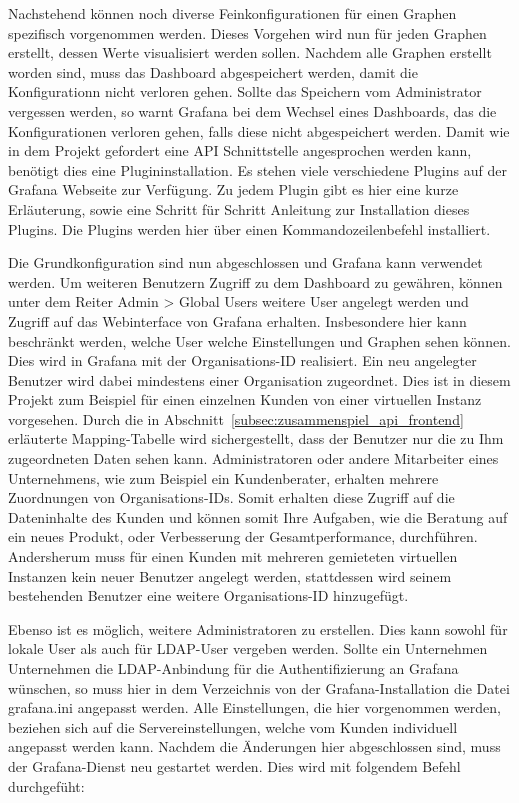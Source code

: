 {Nachstehend können noch diverse Feinkonfigurationen für einen Graphen
spezifisch vorgenommen werden. Dieses Vorgehen wird nun für jeden Graphen
erstellt, dessen Werte visualisiert werden sollen. Nachdem alle Graphen
erstellt worden sind, muss das Dashboard abgespeichert werden, damit die
Konfigurationn nicht verloren gehen. Sollte das Speichern vom
Administrator vergessen werden, so warnt Grafana bei dem Wechsel eines
Dashboards, das die Konfigurationen verloren gehen, falls diese nicht
abgespeichert werden. Damit wie in dem Projekt gefordert eine API
Schnittstelle angesprochen werden kann, benötigt dies eine Plugininstallation.
Es stehen viele verschiedene Plugins auf der Grafana Webseite zur Verfügung. Zu
jedem Plugin gibt es hier eine kurze Erläuterung, sowie eine Schritt für
Schritt Anleitung zur Installation dieses Plugins. Die Plugins werden hier über
einen Kommandozeilenbefehl installiert.

Die Grundkonfiguration sind nun abgeschlossen und Grafana kann verwendet
werden. Um weiteren Benutzern Zugriff zu dem Dashboard zu gewähren, können unter
dem Reiter Admin > Global Users weitere User angelegt werden und
Zugriff auf das Webinterface von Grafana erhalten. Insbesondere hier kann
beschränkt werden, welche User welche Einstellungen und Graphen sehen können.
Dies wird in Grafana mit der Organisations-ID realisiert. Ein neu angelegter
Benutzer wird dabei mindestens einer Organisation zugeordnet. Dies ist in
diesem Projekt zum Beispiel für einen einzelnen Kunden von einer virtuellen
Instanz vorgesehen. Durch die in
Abschnitt~\ref{subsec:zusammenspiel_api_frontend} erläuterte Mapping-Tabelle
wird sichergestellt, dass der Benutzer nur die zu Ihm zugeordneten Daten sehen
kann. Administratoren oder andere Mitarbeiter eines Unternehmens, wie zum
Beispiel ein Kundenberater, erhalten mehrere Zuordnungen von Organisations-IDs.
Somit erhalten diese Zugriff auf die Dateninhalte des Kunden und können somit
Ihre Aufgaben, wie die Beratung auf ein neues Produkt, oder Verbesserung der
Gesamtperformance, durchführen. Andersherum muss für einen Kunden mit mehreren
gemieteten virtuellen Instanzen kein neuer Benutzer angelegt werden,
stattdessen wird seinem bestehenden Benutzer eine weitere Organisations-ID
hinzugefügt.

Ebenso ist es möglich, weitere Administratoren zu erstellen. Dies kann sowohl
für lokale User als auch für LDAP\hyp{}User vergeben werden. Sollte ein Unternehmen
Unternehmen die LDAP\hyp{}Anbindung für die Authentifizierung an Grafana
wünschen, so muss hier in dem Verzeichnis von der Grafana\hyp{}Installation die
Datei grafana.ini angepasst werden. Alle Einstellungen, die hier vorgenommen
werden, beziehen sich auf die Servereinstellungen, welche vom Kunden
individuell angepasst werden kann.  Nachdem die Änderungen hier abgeschlossen
sind, muss der Grafana\hyp{}Dienst neu gestartet werden. Dies wird mit
folgendem Befehl durchgefüht:

}
